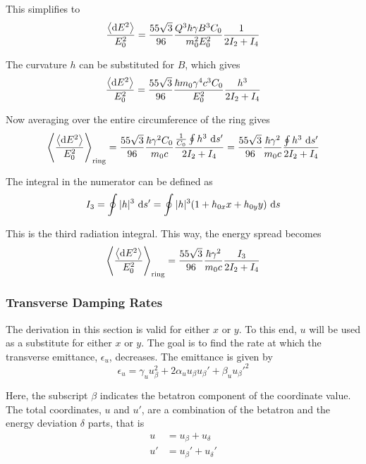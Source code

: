 This simplifies to
\begin{equation}
    \frac{\left\langle {\text{d}E^2} \right\rangle}{E_0^2} = \frac{55 \sqrt{3}}{96} \frac{Q^3 \hbar \gamma B^3 C_0}{m_0^2 E_0^2} \frac{1}{2I_2 + I_4}
\end{equation}

The curvature $h$ can be substituted for $B$, which gives
\begin{equation}
    \frac{\left\langle {\text{d}E^2} \right\rangle}{E_0^2} = \frac{55 \sqrt{3}}{96}
    \frac{\hbar m_0 \gamma^4 c^3 C_0}{E_0^2} \frac{h^3}{2I_2 + I_4}
    \label{eq:meanenergydeviation}
\end{equation}

Now averaging over the entire circumference of the ring gives
\begin{equation}
    \left\langle {\frac{\left\langle {\text{d}E^2} \right\rangle}{E_0^2}} \right\rangle_\text{ring} = \frac{55 \sqrt{3}}{96} \frac{\hbar \gamma^2 C_0}{m_0 c} \frac{\frac{1}{C_0}\oint h^3 \ \text{d} s'}{2I_2 + I_4} = \frac{55 \sqrt{3}}{96} \frac{\hbar \gamma^2}{m_0 c} \frac{\oint h^3 \ \text{d} s'}{2I_2 + I_4}
\end{equation}

The integral in the numerator can be defined as
\begin{equation}
    I_3 = \oint |h|^3 \ \text{d} s' = \oint |h|^3 (1 + h_{0x} x + h_{0y}y) \ \text{d} s
\end{equation}

This is the third radiation integral. This way, the energy spread becomes
\begin{equation}
\left\langle {\frac{\left\langle {\text{d}E^2} \right\rangle}{E_0^2}} \right\rangle_\text{ring} = \frac{55 \sqrt{3}}{96} \frac{\hbar \gamma^2}{m_0 c} \frac{I_3}{2I_2 + I_4}
\end{equation}

\subsubsection{Transverse Damping Rates}
\label{sec:transversedamping}

The derivation in this section is valid for either $x$ or $y$. To this end, $u$ will be used as a substitute for either $x$ or $y$. The goal is to find the rate at which the transverse emittance, $\epsilon_u$, decreases. The emittance is given by
\begin{equation}
    \epsilon_u = \gamma_u u_\beta^2 + 2 \alpha_u u_\beta u_\beta' + \beta_u u_\beta'^2
    \label{eq:emittanceu}
\end{equation}

Here, the subscript $\beta$ indicates the betatron component of the coordinate value. The total coordinates, $u$ and $u'$, are a combination of the betatron and the energy deviation $\delta$ parts, that is
\begin{align}
    u  &= u_\beta  + u_\delta\\
    u' &= u_\beta' + u_\delta'
\end{align}

